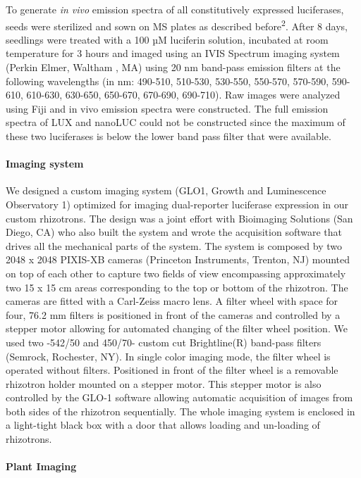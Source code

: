 \documentclass[]{article}
\begin{document}
To generate \emph{in vivo} emission spectra of all constitutively
expressed luciferases, seeds were sterilized and sown on MS plates as
described before\textsuperscript{2}. After 8 days, seedlings were
treated with a 100 µM luciferin solution, incubated at room temperature
for 3 hours and imaged using an IVIS Spectrum imaging system (Perkin
Elmer, Waltham , MA) using 20 nm band-pass emission filters at the
following wavelengths (in nm: 490-510, 510-530, 530-550, 550-570,
570-590, 590-610, 610-630, 630-650, 650-670, 670-690, 690-710). Raw
images were analyzed using Fiji and in vivo emission spectra were
constructed. The full emission spectra of LUX and nanoLUC could not be
constructed since the maximum of these two luciferases is below the
lower band pass filter that were available.

\paragraph{Imaging system}\label{imaging-system}

We designed a custom imaging system (GLO1, Growth and Luminescence
Observatory 1) optimized for imaging dual-reporter luciferase expression
in our custom rhizotrons. The design was a joint effort with Bioimaging
Solutions (San Diego, CA) who also built the system and wrote the
acquisition software that drives all the mechanical parts of the system.
The system is composed by two 2048 x 2048 PIXIS-XB cameras (Princeton
Instruments, Trenton, NJ) mounted on top of each other to capture two
fields of view encompassing approximately two 15 x 15 cm areas
corresponding to the top or bottom of the rhizotron. The cameras are
fitted with a Carl-Zeiss macro lens. A filter wheel with space for four,
76.2 mm filters is positioned in front of the cameras and controlled by
a stepper motor allowing for automated changing of the filter wheel
position. We used two -542/50 and 450/70- custom cut Brightline(R)
band-pass filters (Semrock, Rochester, NY). In single color imaging
mode, the filter wheel is operated without filters. Positioned in front
of the filter wheel is a removable rhizotron holder mounted on a stepper
motor. This stepper motor is also controlled by the GLO-1 software
allowing automatic acquisition of images from both sides of the
rhizotron sequentially. The whole imaging system is enclosed in a
light-tight black box with a door that allows loading and un-loading of
rhizotrons.

\paragraph{Plant Imaging}\label{plant-imaging}
\end{document}
